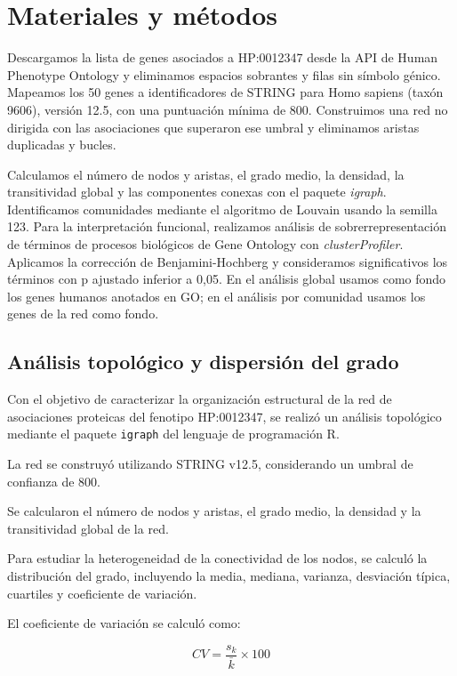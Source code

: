 \section{Materiales y métodos}

Descargamos la lista de genes asociados a HP:0012347 desde la API de Human Phenotype Ontology y eliminamos espacios sobrantes y filas sin símbolo génico. Mapeamos los 50 genes a identificadores de STRING para Homo sapiens (taxón 9606), versión 12.5, con una puntuación mínima de 800. Construimos una red no dirigida con las asociaciones que superaron ese umbral y eliminamos aristas duplicadas y bucles.

Calculamos el número de nodos y aristas, el grado medio, la densidad, la transitividad global y las componentes conexas con el paquete \textit{igraph}. Identificamos comunidades mediante el algoritmo de Louvain usando la semilla 123. Para la interpretación funcional, realizamos análisis de sobrerrepresentación de términos de procesos biológicos de Gene Ontology con \textit{clusterProfiler}. Aplicamos la corrección de Benjamini-Hochberg y consideramos significativos los términos con p ajustado inferior a 0,05. En el análisis global usamos como fondo los genes humanos anotados en GO; en el análisis por comunidad usamos los genes de la red como fondo.


\subsection{Análisis topológico y dispersión del grado}

Con el objetivo de caracterizar la organización
estructural de la red de asociaciones proteicas
del fenotipo HP:0012347, se realizó un análisis
topológico mediante el paquete \texttt{igraph}
del lenguaje de programación R.

La red se construyó utilizando STRING v12.5,
considerando un umbral de confianza de 800.

Se calcularon el número de nodos y aristas,
el grado medio, la densidad y la transitividad
global de la red.

Para estudiar la heterogeneidad de la
conectividad de los nodos, se calculó la
distribución del grado, incluyendo la media,
mediana, varianza, desviación típica,
cuartiles y coeficiente de variación.

El coeficiente de variación se calculó como:

\begin{equation}
CV = \frac{s_k}{\bar{k}} \times 100
\end{equation}

